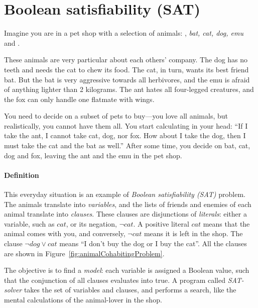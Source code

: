 \def\ant{\text{\em ant}}
\def\bat{\text{\em bat}}
\def\cat{\text{\em cat}}
\def\dog{\text{\em dog}}
\def\emu{\text{\em emu}}
\def\fox{\text{\em fox}}


\section{Boolean satisfiability (SAT)}
\label{sec:SAT-intro}

Imagine you are in a pet shop with a selection of animals: \ant, {\em bat, cat, dog, emu} and \fox.

These animals are very particular about each others' company. The dog has no teeth and needs the cat to chew its food. The cat, in turn, wants its best friend bat. 
But the bat is very aggressive towards all herbivores, and the emu is afraid of anything lighter than 2 kilograms. The ant hates all four-legged creatures, and the fox can only handle one flatmate with wings. 

You need to decide on a subset of pets to buy---you love all animals, but realistically, you cannot have them all. You start calculating in your head: ``If I take the ant, I cannot take cat, dog, nor fox. How about I take the dog, then I must take the cat and the bat as well.''
After some time, you decide on bat, cat, dog and fox, leaving the ant and the emu in the pet shop.

\paragraph{Definition}

This everyday situation is an example of \emph{Boolean satisfiability (SAT)} problem.
The animals translate into \emph{variables}, %
and the lists of friends and enemies of each animal translate into \emph{clauses}.
These clauses are disjunctions of \emph{literals}: either a variable, such as $cat$, or its negation, $\neg{}cat$.
A positive literal $cat$ means that the animal comes with you, 
and conversely, $\neg{}cat$ means it is left in the shop. 
The clause $\neg{}dog \vee cat$ means ``I don't buy the dog or I buy the cat''. 
All the clauses are shown in Figure~\ref{fig:animalCohabitingProblem}.


The objective is to find a \emph{model}: each variable is assigned a Boolean value, such that the conjunction of all clauses evaluates into true. A program called \emph{SAT-solver} takes the set of variables and clauses, and performs a search, like the mental calculations of the animal-lover in the shop.

